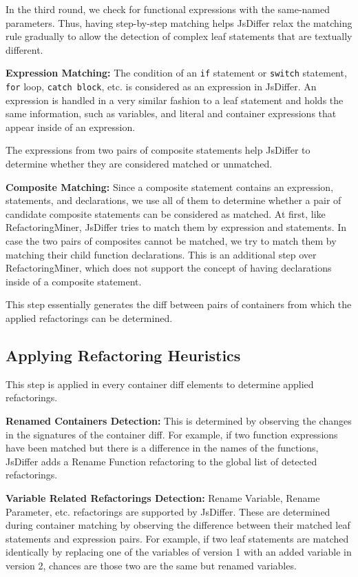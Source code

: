 \documentclass[letterpaper,12pt,onecolumn,final]{report}
\begin{document}
In the third round, we check for functional expressions with the same-named parameters. Thus, having step-by-step matching helps JsDiffer relax the matching rule gradually to allow the detection of complex leaf statements that are textually different.


\textbf{Expression Matching:} The condition of an \texttt{if} statement or \texttt{switch} statement, \texttt{for} loop, \texttt{catch block}, etc. is considered as an expression in JsDiffer. An expression is handled in a very similar fashion to a leaf statement and holds the same information, such as variables, and literal and container expressions that appear inside of an expression.

The expressions from two pairs of composite statements help JsDiffer to determine whether they are considered matched or unmatched.

\textbf{Composite Matching:} Since a composite statement contains an expression, statements, and declarations, we use all of them to determine whether a pair of candidate composite statements can be considered as matched. At first, like RefactoringMiner, JsDiffer tries to match them by expression and statements. In case the two pairs of composites cannot be matched, we try to match them by matching their child function declarations. This is an additional step over RefactoringMiner, which does not support the concept of having declarations inside of a composite statement.

This step essentially generates the diff between pairs of containers from which the applied refactorings can be determined.

\subsection {Applying Refactoring Heuristics}
This step is applied in every container diff elements to determine applied refactorings.

\textbf{Renamed Containers Detection:} This is determined by observing the changes in the signatures of the container diff. For example, if two function expressions have been matched but there is a difference in the names of the functions, JsDiffer adds a Rename Function refactoring to the global list of detected refactorings.

\textbf{Variable Related Refactorings Detection:} Rename Variable, Rename Parameter, etc. refactorings are supported by JsDiffer. These are determined during container matching by observing the difference between their matched leaf statements and expression pairs. For example, if two leaf statements are matched identically by replacing one of the variables of version 1 with an added variable in version 2, chances are those two are the same but renamed variables.
\end{document}
